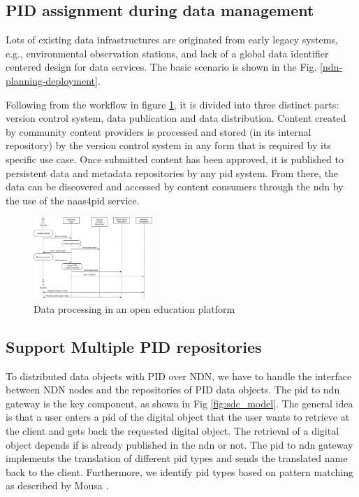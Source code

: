 \documentclass[conference]{IEEEtran}
\begin{document}
\subsection{PID assignment during data management}
Lots of existing data infrastructures are originated from early legacy systems, e.g., environmental observation stations, and lack of a global data identifier centered design for data services. The basic scenario is shown in the Fig. \ref{ndn-planning-deployment}. 

Following from the workflow in figure \ref{fig:sequence}, it is divided into three distinct parts: version control system, data publication and data distribution. Content created by community content providers is processed and stored (in its internal repository) by the version control system in any form that is required by its specific use case. Once submitted content has been approved, it is published to persistent data and metadata repositories by any \gls{pid} system. From there, the data can be discovered and accessed by content consumers through the \gls{ndn} by the use of the \gls{naas4pid} service.

\begin{figure}[h]
\centering
\label{fig:sequence}
\includegraphics[width=0.4\textwidth]{images/sequence.png}
\caption{Data processing in an open education platform}
\end{figure}


\subsection{Support Multiple PID repositories}
To distributed data objects with PID over NDN, we have to handle the interface between NDN nodes and the repositories of PID data objects. The \gls{pid} to \gls{ndn} gateway is the key component, as shown in Fig \ref{fig:sdc_model}. The general idea is that a user enters a \gls{pid} of the digital object that the user wants to retrieve at the client and gets back the requested digital object. The retrieval of a digital object depends if is already published in the \gls{ndn} or not. The \gls{pid} to \gls{ndn} gateway implements the translation of different \gls{pid} types and sends the translated name back to the client. Furthermore, we identify \gls{pid} types based on pattern matching as described by Mousa \cite{ndn-app-aware}.
\end{document}
